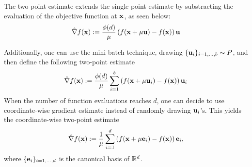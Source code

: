 The two-point estimate extends the single-point estimate by substracting the evaluation of the objective function at $\bold{x}$, as seen below:
\begin{equation}
    \hat{\nabla} f(\bold{x}) := \frac{\phi(d)}{\mu}\left(f(\bold{x}+\mu \bold{u})-f(\bold{x})\right)\bold{u}
    \label{eq:2.3}
\end{equation}



Additionally, one can use the mini-batch technique, drawing $\{\bold{u}_i\}_{i=1,...,b} \sim P$, and then define the following two-point estimate
\begin{equation}
    \hat{\nabla} f(\bold{x}) := \frac{\phi(d)}{\mu}\sum_{i=1}^b\left(f(\bold{x}+\mu \bold{u}_i)-f(\bold{x})\right)\bold{u}_i
\end{equation}
When the number of function evaluations reaches $d$, one can decide to use coordinate-wise gradient estimate instead of randomly drawing $\bold{u}_i$'s. This yields the coordinate-wise two-point estimate
\begin{equation}
    \hat{\nabla} f(\bold{x}) := \frac{1}{\mu}\sum_{i=1}^d\left(f(\bold{x}+\mu \bold{e}_i)-f(\bold{x})\right)\bold{e}_i,
    \label{eq:2.5}
\end{equation}
where $\{\bold{e}_i\}_{i=1,...,d}$ is the canonical basis of $\mathbb{R}^d$. 


